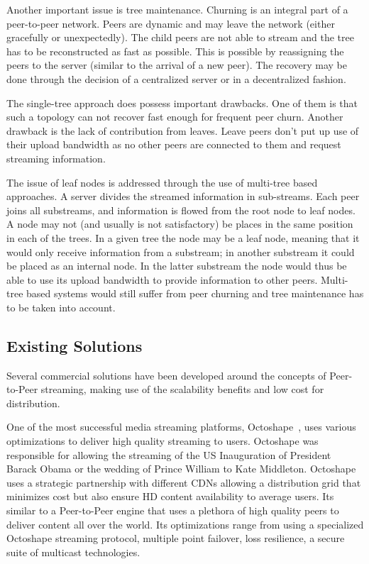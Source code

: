 Another important issue is tree maintenance. Churning is an integral part of
a peer-to-peer network. Peers are dynamic and may leave the network (either
gracefully or unexpectedly). The child peers are not able to stream and the
tree has to be reconstructed as fast as possible. This is possible by
reassigning the peers to the server (similar to the arrival of a new peer).
The recovery may be done through the decision of a centralized server or in a
decentralized fashion.

The single-tree approach does possess important drawbacks. One of them is that
such a topology can not recover fast enough for frequent peer churn. Another
drawback is the lack of contribution from leaves. Leave peers don't put up use
of their upload bandwidth as no other peers are connected to them and request
streaming information.

The issue of leaf nodes is addressed through the use of multi-tree based
approaches. A server divides the streamed information in sub-streams. Each
peer joins all substreams, and information is flowed from the root node to
leaf nodes. A node may not (and usually is not satisfactory) be places in the
same position in each of the trees. In a given tree the node may be a leaf
node, meaning that it would only receive information from a substream; in
another substream it could be placed as an internal node. In the latter
substream the node would thus be able to use its upload bandwidth to provide
information to other peers. Multi-tree based systems would still suffer from
peer churning and tree maintenance has to be taken into account.

\subsection{Existing Solutions}
\label{subsec:p2p-systems:solutions}

Several commercial solutions have been developed around the concepts of
Peer-to-Peer streaming, making use of the scalability benefits and low cost
for distribution.

One of the most successful media streaming platforms,
Octoshape~\cite{octoshape},
uses various optimizations to deliver high quality streaming to users.
Octoshape was responsible for allowing the streaming of the US Inauguration of
President Barack Obama or the wedding of Prince William to Kate Middleton.
Octoshape uses a strategic partnership with different CDNs allowing a
distribution grid that minimizes cost but also ensure HD content availability
to average users. Its similar to a Peer-to-Peer engine that uses a plethora of
high quality peers to deliver content all over the world. Its optimizations
range from using a specialized Octoshape streaming protocol, multiple point
failover, loss resilience, a secure suite of multicast technologies.

